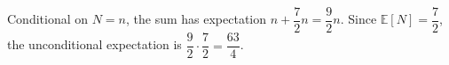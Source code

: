 Conditional on $N=n$, the sum has expectation $n+\dfrac{7}{2}n=\dfrac{9}{2}n$. Since $\mathbb E[N]=\dfrac{7}{2}$, the unconditional expectation is $\dfrac{9}{2}\cdot\dfrac{7}{2}=\boxed{\dfrac{63}{4}}$.
